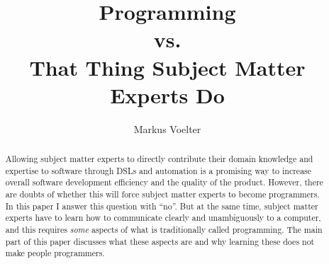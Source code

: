 \documentclass[runningheads]{llncs}
\begin{document}
%
\title{Programming \\ vs. \\ That Thing Subject Matter Experts Do}


\author{Markus Voelter}
\maketitle              %
\begin{abstract}
Allowing subject matter experts to directly contribute their domain knowledge
and expertise to software through DSLs and automation is a promising way to increase
overall software development efficiency and the quality of the product. However,
there are doubts of whether this will force subject matter experts to become
programmers. In this paper I answer this question with ``no''. But at the same
time, subject matter experts have to learn how to communicate clearly and 
unambiguously to a computer, and this requires \emph{some} aspects of what
is traditionally called programming. The main part of this paper discusses
what these aspects are and why learning these does not make people programmers. 
\end{abstract}
%
%
%

\end{document}
